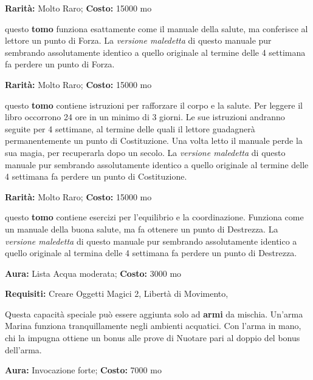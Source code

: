 \begin{multicols}{2}
\medskip


\textbf{Rarità:} Molto Raro; \textbf{Costo:} 15000 mo

questo \textbf{tomo} funziona esattamente come il manuale della salute, ma conferisce al lettore un punto di Forza. La \emph{versione maledetta} di questo manuale pur sembrando assolutamente identico a quello originale al termine delle 4 settimana fa perdere un punto di Forza.


\textbf{Rarità:} Molto Raro; \textbf{Costo:} 15000 mo

questo \textbf{tomo} contiene istruzioni per rafforzare il corpo e la salute. Per leggere il libro occorrono 24 ore in un minimo di 3 giorni. Le sue istruzioni andranno seguite per 4 settimane, al termine delle quali il lettore guadagnerà permanentemente un punto di Costituzione. Una volta letto il manuale perde la sua magia, per recuperarla dopo un secolo. La \emph{versione maledetta} di questo manuale pur sembrando assolutamente identico a quello originale al termine delle 4 settimana fa perdere un punto di Costituzione.


\textbf{Rarità:} Molto Raro; \textbf{Costo:} 15000 mo

questo \textbf{tomo} contiene esercizi per l'equilibrio e la coordinazione. Funziona come un manuale della buona salute, ma fa ottenere un punto di Destrezza. La \emph{versione maledetta} di questo manuale pur sembrando assolutamente identico a quello originale al termina delle 4 settimana fa perdere un punto di Destrezza.


\textbf{Aura:} Lista Acqua moderata; \textbf{Costo:} 3000 mo

\textbf{Requisiti:} Creare Oggetti Magici 2, Libertà di Movimento,

Questa capacità speciale può essere aggiunta solo ad \textbf{armi} da mischia. Un'arma Marina funziona tranquillamente negli ambienti acquatici. Con l'arma in mano, chi la impugna ottiene un bonus alle prove di Nuotare pari al doppio del bonus dell'arma.


\textbf{Aura:} Invocazione forte; \textbf{Costo:} 7000 mo


\end{multicols}

